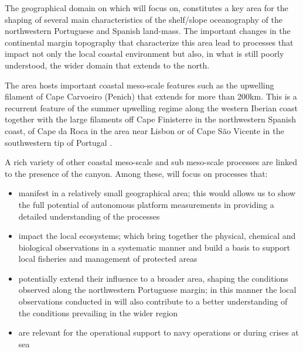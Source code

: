 The geographical domain on which \proj will focus on, constitutes a
key area for the shaping of several main characteristics of the
shelf/slope oceanography of the northwestern Portuguese and Spanish
land-mass.  The important changes in the continental margin topography
that characterize this area lead to processes that impact not only the
local coastal environment but also, in what is still poorly understood,
the wider domain that extends to the north.


The area hosts important coastal meso-scale features such as the
upwelling filament of Cape Carvoeiro (Penich) that extends for more
than 200km. This is a recurrent feature of the summer upwelling regime
along the western Iberian coast together with the large filaments off
Cape Finisterre in the northwestern Spanish coast, of Cape da Roca in
the area near Lisbon or of Cape S\~{a}o Vicente in the southwestern
tip of Portugal \cite{haynes93}.

A rich variety of other coastal meso-scale and sub meso-scale
processes are linked to the presence of the \naz canyon. Among these,
\proj will focus on processes that:

\begin{itemize}[noitemsep,topsep=0pt,parsep=0pt,partopsep=0pt]

\item manifest in a relatively small geographical area; this would
  allows us to show the full potential of autonomous platform
  measurements in providing a detailed understanding of the processes

\item impact the local ecosystems; which bring together the physical,
  chemical and biological observations in a systematic manner and
  build a basis to support local fisheries and management of protected
  areas

\item potentially extend their influence to a broader area, shaping
  the conditions observed along the northwestern Portuguese margin; in
  this manner the local observations conducted in \proj will also
  contribute to a better understanding of the conditions prevailing in
  the wider region

\item are relevant for the operational support to navy operations or
  during crises at sea

\end{itemize}  

